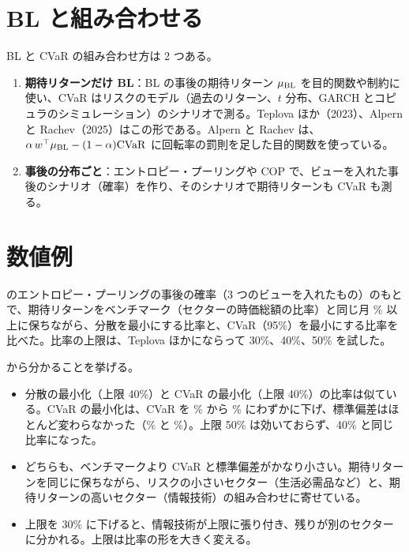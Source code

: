 \section{BL と組み合わせる}

BL と CVaR の組み合わせ方は 2 つある。

\begin{enumerate}
\item \textbf{期待リターンだけ BL}：BL の事後の期待リターン $\mu_{\mathrm{BL}}$ を目的関数や制約に使い、CVaR はリスクのモデル（過去のリターン、$t$ 分布、GARCH とコピュラのシミュレーション）のシナリオで測る。Teplova ほか（2023）、Alpern と Rachev（2025）はこの形である。Alpern と Rachev は、$\alpha\,w^{\top}\mu_{\mathrm{BL}}-(1-\alpha)\mathrm{CVaR}$ に回転率の罰則を足した目的関数を使っている。
\item \textbf{事後の分布ごと}：エントロピー・プーリングや COP で、ビューを入れた事後のシナリオ（確率）を作り、そのシナリオで期待リターンも CVaR も測る。
\end{enumerate}

\section{数値例}

 のエントロピー・プーリングの事後の確率（3 つのビューを入れたもの）のもとで、期待リターンをベンチマーク（セクターの時価総額の比率）と同じ月 \% 以上に保ちながら、分散を最小にする比率と、CVaR（95\%）を最小にする比率を比べた。比率の上限は、Teplova ほかにならって 30\%、40\%、50\% を試した。

\begin{table}[htbp]
\centering
\caption{エントロピー・プーリングの事後の確率のもとでの、分散の最小化と CVaR の最小化（月次 \%）。期待リターンはベンチマークと同じ水準以上。下の 4 行は事後の確率で測ったリスク。}
\label{tab:cvar}
\end{table}

 から分かることを挙げる。

\begin{itemize}
\item 分散の最小化（上限 40\%）と CVaR の最小化（上限 40\%）の比率は似ている。CVaR の最小化は、CVaR を \% から \% にわずかに下げ、標準偏差はほとんど変わらなかった（\% と \%）。上限 50\% は効いておらず、40\% と同じ比率になった。
\item どちらも、ベンチマークより CVaR と標準偏差がかなり小さい。期待リターンを同じに保ちながら、リスクの小さいセクター（生活必需品など）と、期待リターンの高いセクター（情報技術）の組み合わせに寄せている。
\item 上限を 30\% に下げると、情報技術が上限に張り付き、残りが別のセクターに分かれる。上限は比率の形を大きく変える。
\end{itemize}

